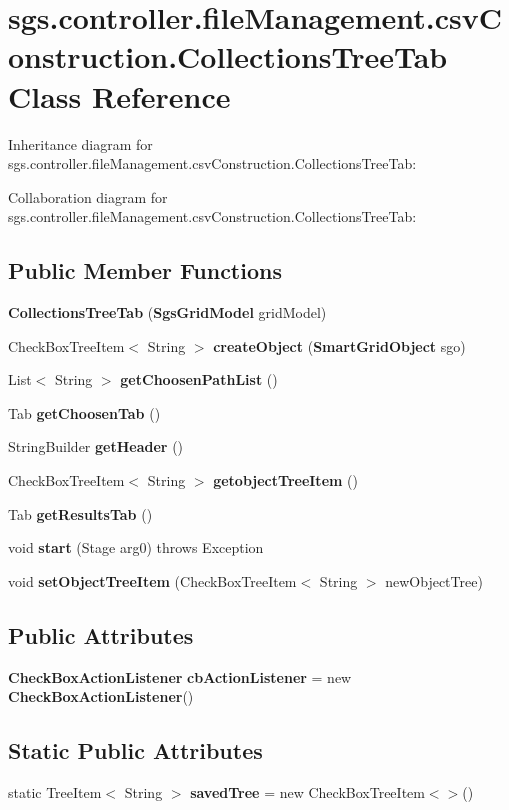 \section{sgs.\-controller.\-file\-Management.\-csv\-Construction.\-Collections\-Tree\-Tab Class Reference}
\label{classsgs_1_1controller_1_1file_management_1_1csv_construction_1_1_collections_tree_tab}


Inheritance diagram for sgs.\-controller.\-file\-Management.\-csv\-Construction.\-Collections\-Tree\-Tab\-:


Collaboration diagram for sgs.\-controller.\-file\-Management.\-csv\-Construction.\-Collections\-Tree\-Tab\-:
\subsection*{Public Member Functions}
\begin{DoxyCompactItemize}
\item 
{\bf Collections\-Tree\-Tab} ({\bf Sgs\-Grid\-Model} grid\-Model)
\item 
Check\-Box\-Tree\-Item$<$ String $>$ {\bf create\-Object} ({\bf Smart\-Grid\-Object} sgo)
\item 
List$<$ String $>$ {\bf get\-Choosen\-Path\-List} ()
\item 
Tab {\bf get\-Choosen\-Tab} ()
\item 
String\-Builder {\bf get\-Header} ()
\item 
Check\-Box\-Tree\-Item$<$ String $>$ {\bf getobject\-Tree\-Item} ()
\item 
Tab {\bf get\-Results\-Tab} ()
\item 
void {\bf start} (Stage arg0)  throws Exception 
\item 
void {\bf set\-Object\-Tree\-Item} (Check\-Box\-Tree\-Item$<$ String $>$ new\-Object\-Tree)
\end{DoxyCompactItemize}
\subsection*{Public Attributes}
\begin{DoxyCompactItemize}
\item 
{\bf Check\-Box\-Action\-Listener} {\bf cb\-Action\-Listener} = new {\bf Check\-Box\-Action\-Listener}()
\end{DoxyCompactItemize}
\subsection*{Static Public Attributes}
\begin{DoxyCompactItemize}
\item 
static Tree\-Item$<$ String $>$ {\bf saved\-Tree} = new Check\-Box\-Tree\-Item$<$$>$()
\end{DoxyCompactItemize}



